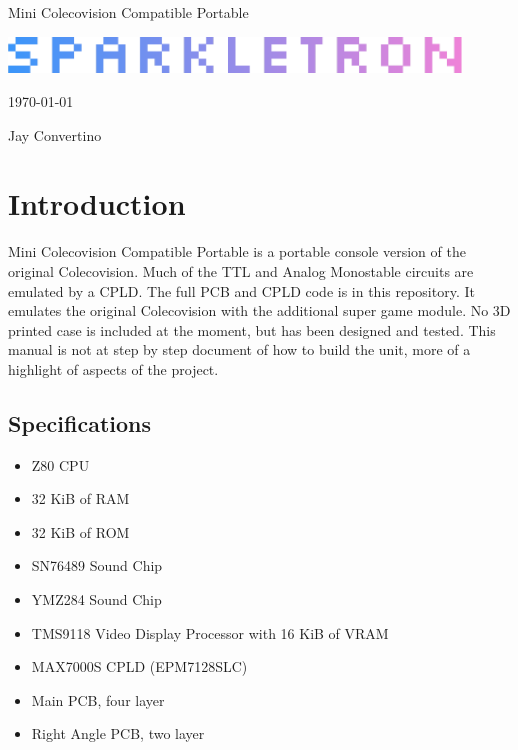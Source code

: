 \begin{titlepage}
  \begin{center}

  {\Huge Mini Colecovision Compatible Portable}

  \vspace{25mm}

  \includegraphics[width=0.90\textwidth,height=\textheight,keepaspectratio]{img/SPARKLETRON.png}

  \vspace{25mm}

  \today

  \vspace{15mm}

  {\Large Jay Convertino}

  \end{center}
\end{titlepage}

\tableofcontents

\newpage

\section{Introduction}

\par
Mini Colecovision Compatible Portable is a portable console version of the original Colecovision. Much of the TTL and Analog Monostable circuits
are emulated by a CPLD. The full PCB and CPLD code is in this repository. It emulates the original Colecovision
with the additional super game module. No 3D printed case is included at the moment, but has been designed and tested. This
manual is not at step by step document of how to build the unit, more of a highlight of aspects of the project.

\subsection{Specifications}

\par
\begin{itemize}
  \item Z80 CPU
  \item 32 KiB of RAM
  \item 32 KiB of ROM
  \item SN76489 Sound Chip
  \item YMZ284 Sound Chip
  \item TMS9118 Video Display Processor with 16 KiB of VRAM
  \item MAX7000S CPLD (EPM7128SLC)
  \item Main PCB, four layer
  \item Right Angle PCB, two layer
\end{itemize}

